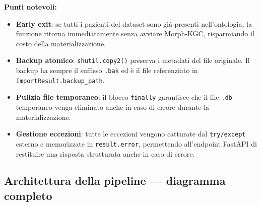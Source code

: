 \documentclass[a4paper,12pt]{article}
\begin{document}
\noindent \textbf{Punti notevoli:}
\begin{itemize}
  \item \textbf{Early exit}: se tutti i pazienti del dataset sono gi\`{a}
        presenti nell'ontologia, la funzione ritorna immediatamente senza
        avviare Morph-KGC, risparmiando il costo della materializzazione.
  \item \textbf{Backup atomico}: \texttt{shutil.copy2()} preserva i
        metadati del file originale. Il backup ha sempre il suffisso
        \texttt{.bak} ed \`{e} il file referenziato in
        \texttt{ImportResult.backup\_path}.
  \item \textbf{Pulizia file temporaneo}: il blocco \texttt{finally}
        garantisce che il file \texttt{.db} temporaneo venga eliminato
        anche in caso di errore durante la materializzazione.
  \item \textbf{Gestione eccezioni}: tutte le eccezioni vengono catturate
        dal \texttt{try/except} esterno e memorizzate in
        \texttt{result.error}, permettendo all'endpoint FastAPI di
        restituire una risposta strutturata anche in caso di errore.
\end{itemize}

\subsection{Architettura della pipeline --- diagramma completo}
\end{document}
